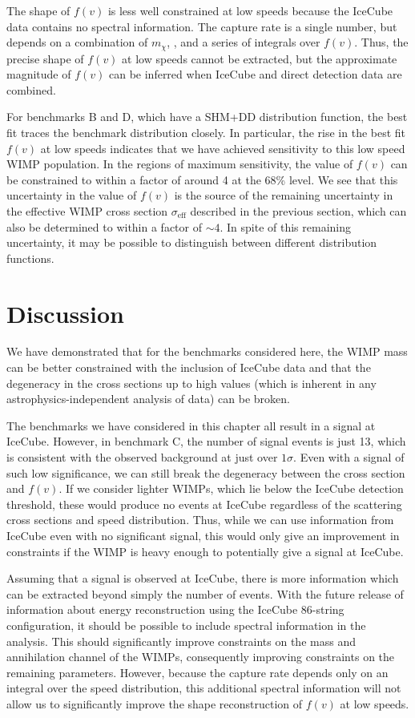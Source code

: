 The shape of $f(v)$ is less well constrained at low speeds because the IceCube data contains no spectral information. The capture rate is a single number, but depends on a combination of $m_\chi$, \sigmapsi, \sigmapsd and a series of integrals over $f(v)$. Thus, the precise shape of $f(v)$ at low speeds cannot be extracted, but the approximate magnitude of $f(v)$ can be inferred when IceCube and direct detection data are combined.

For benchmarks B and D, which have a SHM+DD distribution function, the best fit traces the benchmark distribution closely. In particular, the rise in the best fit $f(v)$ at low speeds indicates that we have achieved sensitivity to this low speed WIMP population. In the regions of maximum sensitivity, the value of $f(v)$ can be constrained to within a factor of around 4 at the 68\% level. We see that this uncertainty in the value of $f(v)$ is the source of the remaining uncertainty in the effective WIMP cross section $\sigma_\textrm{eff}$ described in the previous section, which can also be determined to within a factor of $\sim 4$. In spite of this remaining uncertainty, it may be possible to distinguish between different distribution functions. 

\section{Discussion}

We have demonstrated that for the benchmarks considered here, the WIMP mass can be better constrained with the inclusion of IceCube data and that the degeneracy in the cross sections up to high values (which is inherent in any astrophysics-independent analysis of data) can be broken.

The benchmarks we have considered in this chapter all result in a signal at IceCube. However, in benchmark C, the number of signal events is just 13, which is consistent with the observed background at just over $1\sigma$. Even with a signal of such low significance, we can still break the degeneracy between the cross section and $f(v)$. If we consider lighter WIMPs, which lie below the IceCube detection threshold, these would produce no events at IceCube regardless of the scattering cross sections and speed distribution. Thus, while we can use information from IceCube even with no significant signal, this would only give an improvement in constraints if the WIMP is heavy enough to potentially give a signal at IceCube.

Assuming that a signal is observed at IceCube, there is more information which can be extracted beyond simply the number of events. With the future release of information about energy reconstruction using the IceCube 86-string configuration, it should be possible to include spectral information in the analysis. This should significantly improve constraints on the mass and annihilation channel of the WIMPs, consequently improving constraints on the remaining parameters. However, because the capture rate depends only on an integral over the speed distribution, this additional spectral information will not allow us to significantly improve the shape reconstruction of $f(v)$ at low speeds.

